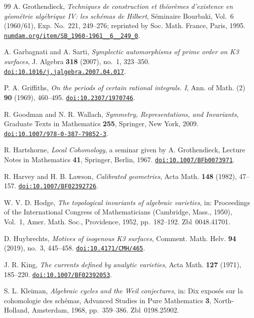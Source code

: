 \documentclass[11pt,reqno]{amsart}
\numberwithin{equation}{section}
\theoremstyle{plain}
\theoremstyle{definition}
\begin{document}
\begin{thebibliography}{99}
A. Grothendieck,
\emph{Techniques de construction et th\'eor\`emes d'existence en g\'eom\'etrie
alg\'ebrique IV: les sch\'emas de Hilbert},
S\'eminaire Bourbaki, Vol.~6 (1960/61), Exp. No.~221, 249--276;
reprinted by Soc. Math. France, Paris, 1995.
\href{http://www.numdam.org/item/SB_1960-1961__6__249_0/}{\nolinkurl{numdam.org/item/SB_1960-1961__6__249_0}}.

A. Garbagnati and A. Sarti,
\emph{Symplectic automorphisms of prime order on K3 surfaces},
J. Algebra \textbf{318} (2007), no.~1, 323--350.
\href{https://doi.org/10.1016/j.jalgebra.2007.04.017}{\nolinkurl{doi:10.1016/j.jalgebra.2007.04.017}}.

P. A. Griffiths,
\emph{On the periods of certain rational integrals. I},
Ann. of Math. (2) \textbf{90} (1969), 460--495.
\href{https://doi.org/10.2307/1970746}{\nolinkurl{doi:10.2307/1970746}}.

R. Goodman and N. R. Wallach,
\emph{Symmetry, Representations, and Invariants},
Graduate Texts in Mathematics \textbf{255}, Springer, New York, 2009.
\href{https://doi.org/10.1007/978-0-387-79852-3}{\nolinkurl{doi:10.1007/978-0-387-79852-3}}.

R. Hartshorne,
\emph{Local Cohomology}, a seminar given by A. Grothendieck,
Lecture Notes in Mathematics \textbf{41}, Springer, Berlin, 1967.
\href{https://doi.org/10.1007/BFb0073971}{\nolinkurl{doi:10.1007/BFb0073971}}.

R. Harvey and H. B. Lawson,
\emph{Calibrated geometries},
Acta Math. \textbf{148} (1982), 47--157.
\href{https://doi.org/10.1007/BF02392726}{\nolinkurl{doi:10.1007/BF02392726}}.

W. V. D. Hodge,
\emph{The topological invariants of algebraic varieties},
in: Proceedings of the International Congress of Mathematicians (Cambridge, Mass., 1950), Vol.~1,
Amer. Math. Soc., Providence, 1952, pp.~182--192. Zbl~0048.41701.

D. Huybrechts,
\emph{Motives of isogenous K3 surfaces},
Comment. Math. Helv. \textbf{94} (2019), no.~3, 445--458.
\href{https://doi.org/10.4171/CMH/465}{\nolinkurl{doi:10.4171/CMH/465}}.

J. R. King,
\emph{The currents defined by analytic varieties},
Acta Math. \textbf{127} (1971), 185--220.
\href{https://doi.org/10.1007/BF02392053}{\nolinkurl{doi:10.1007/BF02392053}}.

S. L. Kleiman,
\emph{Algebraic cycles and the Weil conjectures},
in: Dix expos\'es sur la cohomologie des sch\'emas,
Advanced Studies in Pure Mathematics \textbf{3}, North-Holland, Amsterdam, 1968, pp.~359--386. Zbl~0198.25902.


\end{thebibliography}
\end{document}
